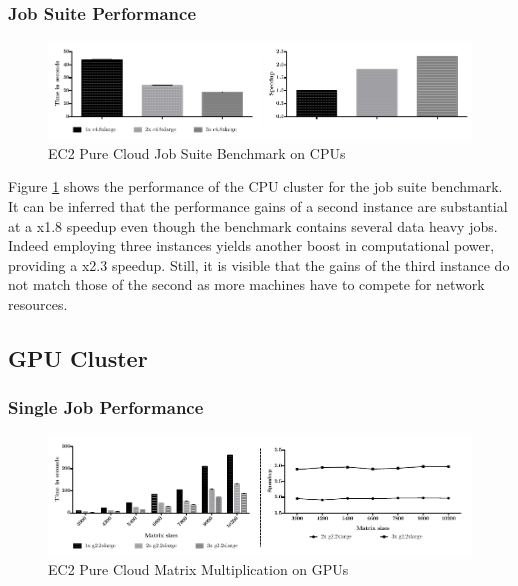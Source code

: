 \subsubsection*{Job Suite Performance}

\begin{figure}[H]
	\includegraphics[width=1.0\textwidth]{images/ec2_cpu_full_benchmark.pdf}
	\centering
	\caption{EC2 Pure Cloud Job Suite Benchmark on CPUs}
	\label{img:ec2_cpu_full_benchmark}
\end{figure}

Figure \ref{img:ec2_cpu_full_benchmark} shows the performance of the CPU cluster for the job suite benchmark. It can be inferred that the performance gains of a second instance are substantial at a x1.8 speedup even though the benchmark contains several data heavy jobs. Indeed employing three instances yields another boost in computational power, providing a x2.3 speedup. Still, it is visible that the gains of the third instance do not match those of the second as more machines have to compete for network resources.

\subsection{GPU Cluster}
\subsubsection*{Single Job Performance}

\begin{figure}[H]
	\includegraphics[width=1.0\textwidth]{images/ec2_gpu_matrix_multiplication.pdf}
	\centering
	\caption{EC2 Pure Cloud Matrix Multiplication on GPUs}
	\label{img:ec2_gpu_matrix_multiplication}
\end{figure}

